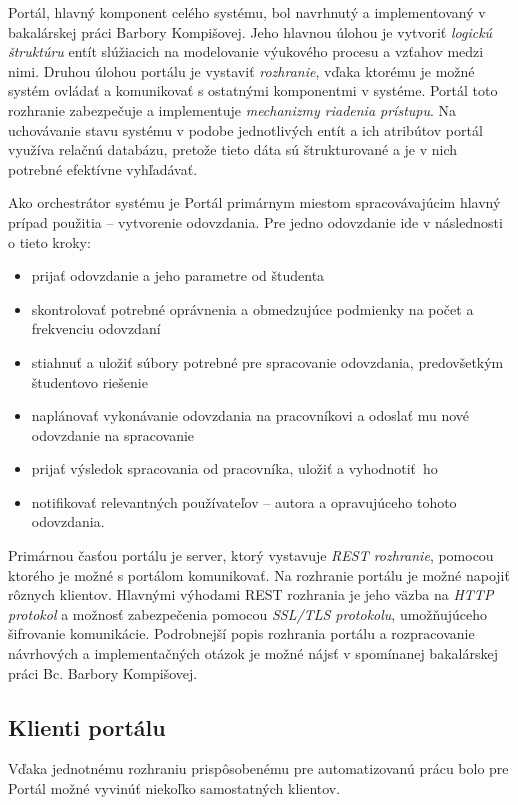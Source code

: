 \documentclass[
  digital, %
  twoside, %
  table,   %
  lof,     %
  lot,     %
]{fithesis3}
\begin{document}
Portál, hlavný komponent celého systému, bol navrhnutý a implementovaný v bakalárskej práci Barbory Kompišovej\cite{kontr-portal}. Jeho hlavnou úlohou je vytvoriť \emph{logickú štruktúru} entít slúžiacich na modelovanie výukového procesu a vzťahov medzi nimi. Druhou úlohou portálu je vystaviť \emph{rozhranie}, vďaka ktorému je možné systém ovládať a komunikovať s ostatnými komponentmi v systéme. Portál toto rozhranie zabezpečuje a implementuje \emph{mechanizmy riadenia prístupu}\cite{RFC4949}. Na uchovávanie stavu systému v podobe jednotlivých entít a ich atribútov portál využíva relačnú databázu, pretože tieto dáta sú štrukturované a je v nich potrebné efektívne vyhľadávať.

Ako orchestrátor systému je Portál primárnym miestom spracovávajúcim hlavný prípad použitia -- vytvorenie odovzdania. Pre jedno odovzdanie ide v následnosti o tieto kroky: 

\begin{itemize}
  \item prijať odovzdanie a jeho parametre od študenta
  \item skontrolovať potrebné oprávnenia a obmedzujúce podmienky na počet a frekvenciu odovzdaní
  \item stiahnuť a uložiť súbory potrebné pre spracovanie odovzdania, predovšetkým študentovo riešenie
  \item naplánovať vykonávanie odovzdania na pracovníkovi a odoslať mu nové odovzdanie na spracovanie
  \item prijať výsledok spracovania od pracovníka, uložiť a vyhodnotiť~ho
  \item notifikovať relevantných používateľov --  autora a opravujúceho tohoto odovzdania.
\end{itemize}

Primárnou časťou portálu je server, ktorý vystavuje \emph{REST rozhranie}\cite{fielding}, pomocou ktorého je možné s portálom komunikovať. Na rozhranie portálu je možné napojiť rôznych klientov. Hlavnými výhodami REST rozhrania je jeho väzba na \emph{HTTP protokol}\cite{RFC2616} a možnosť zabezpečenia pomocou \emph{SSL/TLS protokolu}\cite{RFC8446}, umožňujúceho šifrovanie komunikácie. Podrobnejší popis rozhrania portálu a rozpracovanie návrhových a implementačných otázok je možné nájsť v spomínanej bakalárskej práci Bc. Barbory Kompišovej\cite{kontr-portal}.

\subsection{Klienti portálu}
Vďaka jednotnému rozhraniu prispôsobenému pre automatizovanú prácu bolo pre Portál možné vyvinúť niekoľko samostatných klientov. 
\end{document}
